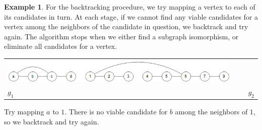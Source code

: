 \documentclass[12pt]{thesis}
\theoremstyle{plain}
\theoremstyle{definition}
\newtheorem{example}[theorem]{Example}
\theoremstyle{remark}
\begin{document}
\begin{example}
For the backtracking procedure, we try mapping a vertex to each of its candidates in turn. At each stage, if we cannot find any viable candidates for a vertex among the neighbors of the candidate in question, we backtrack and try again. The algorithm stops when we either find a subgraph isomorphism, or eliminate all candidates for a vertex.

\vspace{-30pt}
\begin{center}
\begin{tabular}{C{0.35\textwidth}C{0.6\textwidth}}
\includegraphics[width=0.95\textwidth]{ullmann_demo_cropped.png} & \\ $g_1$ & $g_2$\\
\end{tabular}
\end{center}
\begin{minipage}{0.3\textwidth}
\begin{center}
\end{center}
\footnotesize\singlespacing Try mapping $a$ to $1$. There is no viable candidate for $b$ among the neighbors of $1$, so we backtrack and try again.
\end{minipage}\hfill
\begin{minipage}{0.3\textwidth}
\begin{center}

\end{center}
\end{minipage}
\end{example}
\end{document}
